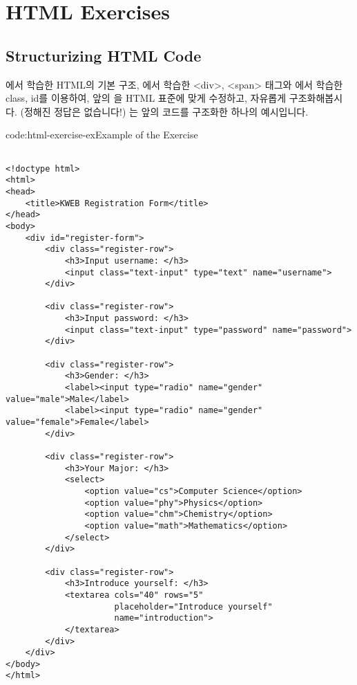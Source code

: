 \section{HTML Exercises} \label{sect:html-exercises}

\subsection*{Structurizing HTML Code}
에서 학습한 HTML의 기본 구조, 에서 학습한 <div>, <span> 태그와 에서 학습한 class, id를 이용하여, 앞의 을 HTML 표준에 맞게 수정하고, 자유롭게 구조화해봅시다. (정해진 정답은 없습니다!) 는 앞의 코드를 구조화한 하나의 예시입니다.

\begin{codeenv}{code:html-exercise-ex}{Example of the Exercise}\begin{verbatim}

<!doctype html>
<html>
<head>
    <title>KWEB Registration Form</title>
</head>
<body>
    <div id="register-form">
        <div class="register-row">
            <h3>Input username: </h3>
            <input class="text-input" type="text" name="username">
        </div>

        <div class="register-row">
            <h3>Input password: </h3>
            <input class="text-input" type="password" name="password">
        </div>

        <div class="register-row">
            <h3>Gender: </h3>
            <label><input type="radio" name="gender" value="male">Male</label>
            <label><input type="radio" name="gender" value="female">Female</label>
        </div>

        <div class="register-row">
            <h3>Your Major: </h3>
            <select>
                <option value="cs">Computer Science</option>
                <option value="phy">Physics</option>
                <option value="chm">Chemistry</option>
                <option value="math">Mathematics</option>
            </select>
        </div>

        <div class="register-row">
            <h3>Introduce yourself: </h3>
            <textarea cols="40" rows="5"
                      placeholder="Introduce yourself"
                      name="introduction">
            </textarea>
        </div>
    </div>
</body>
</html>
\end{verbatim}
\end{codeenv}
